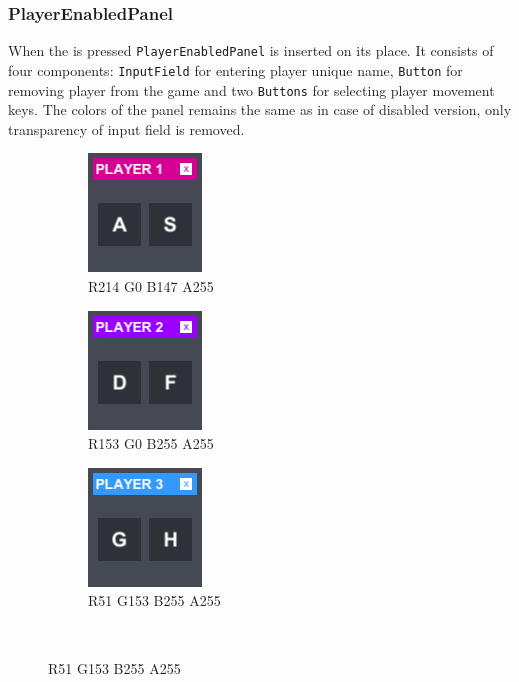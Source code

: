 \subsubsection*{PlayerEnabledPanel}\label{gui-playerenabledpanel}
\indent When the  is pressed \verb+PlayerEnabledPanel+ is inserted on its place. It consists of four components: \verb+InputField+ for entering player unique name, \verb+Button+ for removing player from the game and two \verb+Buttons+ for selecting player movement keys. The colors of the panel remains the same as in case of disabled version, only transparency of input field is removed.
\begin{figure}[h] 
\centering
\begin{subfigure}{0.22\textwidth}
\includegraphics[scale=1]{player1enabledpanel}
\caption*{\hspace*{-0.35cm}R214 G0 B147 A255}
\end{subfigure}
\begin{subfigure}{0.22\textwidth}
\includegraphics[scale=1]{player2enabledpanel}
\caption*{\hspace*{-0.35cm}R153 G0 B255 A255}
\end{subfigure}
\begin{subfigure}{0.22\textwidth}
\includegraphics[scale=1]{player3enabledpanel}
\caption*{\hspace*{-0.35cm}R51 G153 B255 A255}
\end{subfigure} \\

\end{figure}
